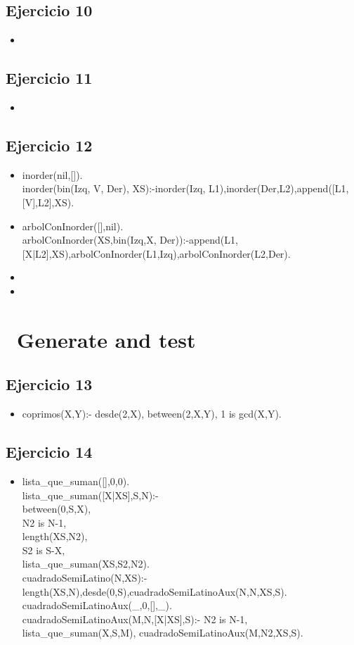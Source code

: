 \documentclass[10pt,a4paper]{article}
\begin{document}
\subsection{Ejercicio 10}
\begin{itemize}
\item
\end{itemize}

\subsection{Ejercicio 11}
\begin{itemize}
\item
\end{itemize}

\subsection{Ejercicio 12}
\begin{itemize}
\item inorder(nil,[]). \\
inorder(bin(Izq, V, Der), XS):-inorder(Izq, L1),inorder(Der,L2),append([L1,[V],L2],XS).
\item arbolConInorder([],nil). \\
arbolConInorder(XS,bin(Izq,X, Der)):-append(L1,[X|L2],XS),arbolConInorder(L1,Izq),arbolConInorder(L2,Der).
\item 
\item 
\end{itemize}
\section*{\ Generate and test}

\subsection{Ejercicio 13}
\begin{itemize}
\item coprimos(X,Y):- desde(2,X), between(2,X,Y), 1 is gcd(X,Y).
\end{itemize}

\subsection{Ejercicio 14}
\begin{itemize}
\item
lista_que_suman([],0,0). \\
lista_que_suman([X|XS],S,N):- \\
    between(0,S,X),  \\
    N2 is N-1, \\
    length(XS,N2),  \\
    S2 is S-X,  \\
    lista_que_suman(XS,S2,N2). \\
cuadradoSemiLatino(N,XS):-length(XS,N),desde(0,S),cuadradoSemiLatinoAux(N,N,XS,S). \\
cuadradoSemiLatinoAux(_,0,[],_). \\
cuadradoSemiLatinoAux(M,N,[X|XS],S):- N2 is N-1, lista_que_suman(X,S,M), cuadradoSemiLatinoAux(M,N2,XS,S).
\end{itemize}
\end{document}
